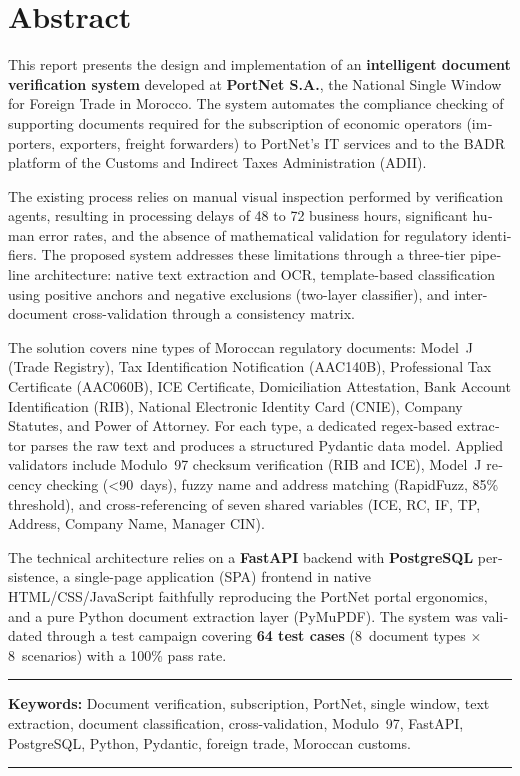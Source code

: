 \chapter*{Abstract}

\begingroup
{}

\begin{otherlanguage}{english}
This report presents the design and implementation of an \textbf{intelligent document verification system} developed at \textbf{PortNet S.A.}, the National Single Window for Foreign Trade in Morocco. The system automates the compliance checking of supporting documents required for the subscription of economic operators (importers, exporters, freight forwarders) to PortNet's IT services and to the BADR platform of the Customs and Indirect Taxes Administration (ADII).

The existing process relies on manual visual inspection performed by verification agents, resulting in processing delays of 48 to 72 business hours, significant human error rates, and the absence of mathematical validation for regulatory identifiers. The proposed system addresses these limitations through a three-tier pipeline architecture: native text extraction and OCR, template-based classification using positive anchors and negative exclusions (two-layer classifier), and inter-document cross-validation through a consistency matrix.

The solution covers nine types of Moroccan regulatory documents: Model~J (Trade Registry), Tax Identification Notification (AAC140B), Professional Tax Certificate (AAC060B), ICE Certificate, Domiciliation Attestation, Bank Account Identification (RIB), National Electronic Identity Card (CNIE), Company Statutes, and Power of Attorney. For each type, a dedicated regex-based extractor parses the raw text and produces a structured Pydantic data model. Applied validators include Modulo~97 checksum verification (RIB and ICE), Model~J recency checking (\textless 90~days), fuzzy name and address matching (RapidFuzz, 85\% threshold), and cross-referencing of seven shared variables (ICE, RC, IF, TP, Address, Company Name, Manager CIN).

The technical architecture relies on a \textbf{FastAPI} backend with \textbf{PostgreSQL} persistence, a single-page application (SPA) frontend in native HTML/CSS/JavaScript faithfully reproducing the PortNet portal ergonomics, and a pure Python document extraction layer (PyMuPDF). The system was validated through a test campaign covering \textbf{64 test cases} (8~document types $\times$ 8~scenarios) with a 100\% pass rate.
\end{otherlanguage}

\noindent\rule[2pt]{\textwidth}{0.5pt}

\begin{otherlanguage}{english}
{\textbf{Keywords:}} Document verification, subscription, PortNet, single window, text extraction, document classification, cross-validation, Modulo~97, FastAPI, PostgreSQL, Python, Pydantic, foreign trade, Moroccan customs.
\end{otherlanguage}

\noindent\rule[2pt]{\textwidth}{0.5pt}
\endgroup
